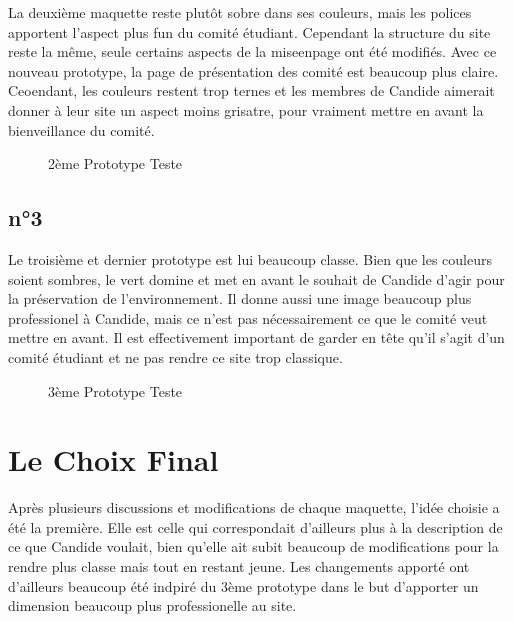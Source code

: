 \documentclass[a4,10pt,french]{sphinxmanual}
\begin{document}
\sphinxAtStartPar
La deuxième maquette reste plutôt sobre dans ses couleurs, mais les polices apportent l’aspect plus fun du comité étudiant. Cependant la structure du site reste la même, seule certains aspects de la mise\sphinxhyphen{}en\sphinxhyphen{}page ont été modifiés. Avec ce nouveau prototype, la page de présentation des comité est beaucoup plus claire.\\
Ceoendant, les couleurs restent trop ternes et les membres de Candide aimerait donner à leur site un aspect moins grisatre, pour vraiment mettre en avant la bienveillance du comité.

\begin{figure}[htbp]
\centering
\capstart

\noindent{}
\caption{2ème Prototype Teste}\label{\detokenize{chapitre-02:id2}}\end{figure}


\subsection{n°3}
\label{\detokenize{chapitre-02:n3}}
\sphinxAtStartPar
Le troisième et dernier prototype est lui beaucoup classe. Bien que les couleurs soient sombres, le vert domine et met en avant le souhait de Candide d’agir pour la préservation de l’environnement. Il donne aussi une image beaucoup plus professionel à Candide, mais ce n’est pas nécessairement ce que le comité veut mettre en avant. Il est effectivement important de garder en tête qu’il s’agit d’un comité étudiant et ne pas rendre ce site trop classique.

\begin{figure}[htbp]
\centering
\capstart

\noindent{}
\caption{3ème Prototype Teste}\label{\detokenize{chapitre-02:id3}}\end{figure}


\section{Le Choix Final}
\label{\detokenize{chapitre-02:le-choix-final}}
\sphinxAtStartPar
Après plusieurs discussions et modifications de chaque maquette, l’idée choisie a été la première. Elle est celle qui correspondait d’ailleurs plus à la description de ce que Candide voulait, bien qu’elle ait subit beaucoup de modifications pour la rendre plus classe mais tout en restant jeune. Les changements apporté ont d’ailleurs beaucoup été indpiré du 3ème prototype dans le but d’apporter un dimension beaucoup plus professionelle au site.
\end{document}
